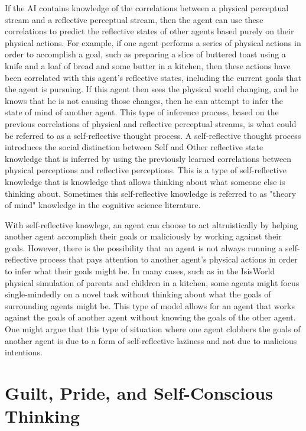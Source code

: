 If the AI contains knowledge of the correlations between a physical
perceptual stream and a reflective perceptual stream, then the agent
can use these correlations to predict the reflective states of other
agents based purely on their physical actions. For example, if one
agent performs a series of physical actions in order to accomplish a
goal, such as preparing a slice of buttered toast using a knife and a
loaf of bread and some butter in a kitchen, then these actions have
been correlated with this agent's reflective states, including the
current goals that the agent is pursuing. If this agent then sees the
physical world changing, and he knows that he is not causing those
changes, then he can attempt to infer the state of mind of another
agent. This type of inference process, based on the previous
correlations of physical and reflective perceptual streams, is what
could be referred to as a self-reflective thought process. A
self-reflective thought process introduces the social distinction
between Self and Other reflective state knowledge that is inferred by
using the previously learned correlations between physical perceptions
and reflective perceptions.  This is a type of self-reflective
knowledge that is knowledge that allows thinking about what someone
else is thinking about.  Sometimes this self-reflective knowledge is
referred to as "theory of mind" knowledge in the cognitive science
literature.

With self-reflective knowlege, an agent can choose to act
altruistically by helping another agent accomplish their goals or
maliciously by working against their goals. However, there is the
possibility that an agent is not always running a self-reflective
process that pays attention to another agent's physical actions in
order to infer what their goals might be. In many cases, such as in
the IsisWorld physical simulation of parents and children in a
kitchen, some agents might focus single-mindedly on a novel task
without thinking about what the goals of surrounding agents might
be. This type of model allows for an agent that works against the
goals of another agent without knowing the goals of the other
agent. One might argue that this type of situation where one agent
clobbers the goals of another agent is due to a form of
self-reflective laziness and not due to malicious intentions.

\section{Guilt, Pride, and Self-Conscious Thinking}

